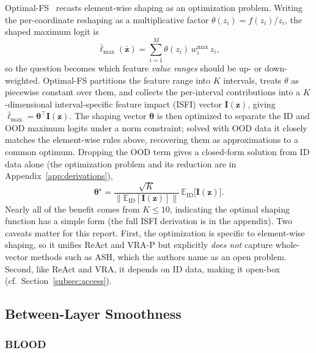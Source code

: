 \documentclass[a4paper]{article}
\begin{document}
Optimal-FS~\citep{optimalfs} recasts element-wise shaping as an optimization
problem. Writing the per-coordinate reshaping as a multiplicative factor
$\theta(z_i) = f(z_i)/z_i$, the shaped maximum logit is
\begin{equation}
\label{eq:optfs}
\bar{\ell}_{\max}(\bar{\mathbf{z}}) = \sum_{i=1}^{M} \theta(z_i)\, w^{\max}_i\, z_i ,
\end{equation}
so the question becomes which feature \emph{value ranges} should be up- or
down-weighted. Optimal-FS partitions the feature range into $K$ intervals, treats
$\theta$ as piecewise constant over them, and collects the per-interval contributions
into a $K$-dimensional interval-specific feature impact (ISFI) vector
$\mathbf{I}(\mathbf{z})$, giving $\bar{\ell}_{\max} = \boldsymbol{\theta}^{\top}
\mathbf{I}(\mathbf{z})$. The shaping vector $\boldsymbol{\theta}$ is then optimized to
separate the ID and OOD maximum logits under a norm constraint; solved with OOD data it
closely matches the element-wise rules above, recovering them as approximations to a
common optimum. Dropping the OOD term gives a closed-form solution from ID data alone (the optimization problem
and its reduction are in Appendix~\ref{app:derivations}),
\begin{equation}
\boldsymbol{\theta}^{\star} = \frac{\sqrt{K}}
{\big\| \mathbb{E}_{\mathrm{ID}}[\mathbf{I}(\mathbf{z})] \big\|}\,
\mathbb{E}_{\mathrm{ID}}\big[\mathbf{I}(\mathbf{z})\big] .
\end{equation}
Nearly all of the benefit comes from $K \leq 10$, indicating the optimal shaping
function has a simple form (the full ISFI derivation is in the appendix). Two
caveats matter for this report. First, the optimization is specific to element-wise
shaping, so it unifies ReAct and VRA-P but explicitly \emph{does not} capture
whole-vector methods such as ASH, which the authors name as an open problem.
Second, like ReAct and VRA, it depends on ID data, making it open-box
(cf.\ Section~\ref{subsec:access}).

\subsection{Between-Layer Smoothness}
\subsubsection{BLOOD}
\label{subsec:blood}
\end{document}
